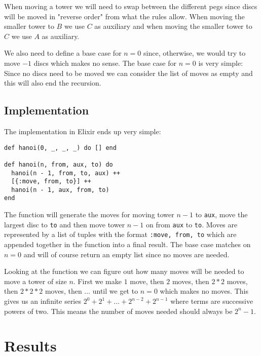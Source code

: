 \documentclass[a4paper,11pt]{article}
\begin{document}
When moving a tower we will need to swap between the different pegs since discs will be moved in "reverse order" from what the rules allow. When moving the smaller tower to $B$ we use $C$ as auxiliary and when moving the smaller tower to $C$ we use $A$ as auxiliary.

We also need to define a base case for $n=0$ since, otherwise, we would try to move $-1$ discs which makes no sense.
The base case for $n=0$ is very simple: Since no discs need to be moved we can consider the list of moves as empty and this will also end the recursion.

\subsection*{Implementation}

The implementation in Elixir ends up very simple:

\begin{verbatim}
def hanoi(0, _, _, _) do [] end

def hanoi(n, from, aux, to) do
  hanoi(n - 1, from, to, aux) ++
  [{:move, from, to}] ++
  hanoi(n - 1, aux, from, to)
end
\end{verbatim}

The function will generate the moves for moving tower $n-1$ to \texttt{aux},
move the largest disc to \texttt{to} and then move tower $n-1$ on from \texttt{aux} to \texttt{to}.
Moves are represented by a list of tuples with the format \texttt{{:move, from, to}} which are appended together in the function into a final result.
The base case matches on $n=0$ and will of course return an empty list since no moves are needed.

Looking at the function we can figure out how many moves will be needed to move a tower of size $n$.
First we make $1$ move, then $2$ moves, then $2*2$ moves, then $2*2*2$ moves, then $\ldots$ until we get to $n=0$ which makes no moves.
This gives us an infinite series $2^0 + 2^1 + \ldots + 2^{n-2} + 2^{n-1}$ where terms are successive powers of two.
This means the number of moves needed should always be $2^n - 1$.

\section*{Results}
\end{document}
